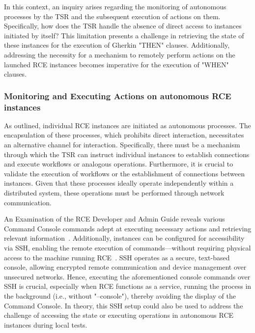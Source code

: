 In this context, an inquiry arises regarding the monitoring of autonomous processes by the \ac{TSR} and the subsequent execution of actions on them. Specifically, how does the \ac{TSR} handle the absence of direct access to instances initiated by itself? This limitation presents a challenge in retrieving the state of these instances for the execution of Gherkin "THEN" clauses. Additionally, addressing the necessity for a mechanism to remotely perform actions on the launched RCE instances becomes imperative for the execution of "WHEN" clauses.


\subsubsection{Monitoring and Executing Actions on autonomous RCE instances}
As outlined, individual RCE instances are initiated as autonomous processes. The encapsulation of these processes, which prohibits direct interaction, necessitates an alternative channel for interaction. Specifically, there must be a mechanism through which the \ac{TSR} can instruct individual instances to establish connections and execute workflows or analogous operations. Furthermore, it is crucial to validate the execution of workflows or the establishment of connections between instances. Given that these processes ideally operate independently within a distributed system, these operations must be performed through network communication.

An Examination of the \ac{RCE} Developer and Admin Guide reveals various Command Console commands adept at executing necessary actions and retrieving relevant information~\cite{rceDevGuide10x}. Additionally, instances can be configured for accessibility via \ac{SSH}, enabling the remote execution of commands—without requiring physical access to the machine running RCE~\cite{rceDevGuide10x}. \ac{SSH} operates as a secure, text-based console, allowing encrypted remote communication and device management over unsecured networks. Hence, executing the aforementioned console commands over \ac{SSH} is crucial, especially when \ac{RCE} functions as a service, running the process in the background (i.e., without "--console"), thereby avoiding the display of the Command Console. In theory, this \ac{SSH} setup could also be used to address the challenge of accessing the state or executing operations in autonomous \ac{RCE} instances during local tests.

